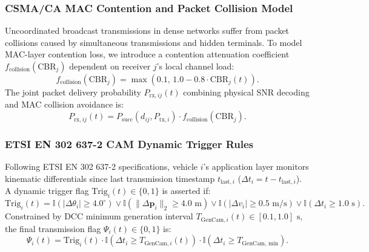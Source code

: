 \documentclass[journal]{IEEEtran}
\begin{document}
\subsubsection{CSMA/CA MAC Contention and Packet Collision Model}
Uncoordinated broadcast transmissions in dense networks suffer from packet collisions caused by simultaneous transmissions and hidden terminals. To model MAC-layer contention loss, we introduce a contention attenuation coefficient $f_{\text{collision}}(\text{CBR}_j)$ dependent on receiver $j$'s local channel load:
\begin{equation}
\label{eq:collision_atten}
f_{\text{collision}}(\text{CBR}_j) = \max\left(0.1, \, 1.0 - 0.8 \cdot \text{CBR}_j(t)\right).
\end{equation}
The joint packet delivery probability $P_{\text{rx}, ij}(t)$ combining physical SNR decoding and MAC collision avoidance is:
\begin{equation}
\label{eq:joint_prx}
P_{\text{rx}, ij}(t) = P_{\text{succ}}(d_{ij}, P_{\text{tx}, i}) \cdot f_{\text{collision}}(\text{CBR}_j).
\end{equation}

\subsubsection{ETSI EN 302 637-2 CAM Dynamic Trigger Rules}
Following ETSI EN 302 637-2 specifications, vehicle $i$'s application layer monitors kinematic differentials since last transmission timestamp $t_{\text{last}, i}$ ($\Delta t_i = t - t_{\text{last}, i}$). A dynamic trigger flag $\text{Trig}_i(t) \in \{0, 1\}$ is asserted if:
\begin{equation}
\label{eq:etsi_trigger}
\text{Trig}_i(t) = \mathbb{I}(|\Delta \theta_i| \ge 4.0^\circ) \lor \mathbb{I}(\|\Delta \mathbf{p}_i\|_2 \ge 4.0\text{ m}) \lor \mathbb{I}(|\Delta v_i| \ge 0.5\text{ m/s}) \lor \mathbb{I}(\Delta t_i \ge 1.0\text{ s}).
\end{equation}
Constrained by DCC minimum generation interval $T_{\text{GenCam}, i}(t) \in [0.1, 1.0]\text{ s}$, the final transmission flag $\Psi_i(t) \in \{0, 1\}$ is:
\begin{equation}
\label{eq:psi_flag}
\Psi_i(t) = \text{Trig}_i(t) \cdot \mathbb{I}(\Delta t_i \ge T_{\text{GenCam}, i}(t)) \cdot \mathbb{I}(\Delta t_i \ge T_{\text{GenCam, min}}).
\end{equation}
\end{document}
